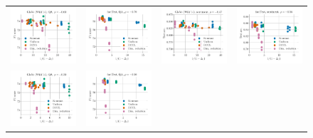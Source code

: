 \begin{figure}
\begin{tabular}{@{\hskip -0.0in}c@{\hskip -0.0in}c@{\hskip -0.0in}c@{\hskip -0.0in}c@{\hskip -0.0in}}
		\includegraphics[width=.245\linewidth]{figures/glove400k_qa_best-f1_vs_gram-large-dim-delta1-3-trans_linx_stoc.pdf} &
		\includegraphics[width=.245\linewidth]{figures/fasttext1m_qa_best-f1_vs_gram-large-dim-delta1-3-trans_linx_stoc.pdf} &
		\includegraphics[width=.245\linewidth]{figures/glove400k_sentiment_sst_test-acc_vs_gram-large-dim-delta1-3-trans_linx_stoc.pdf} &
		\includegraphics[width=.245\linewidth]{figures/fasttext1m_sentiment_sst_test-acc_vs_gram-large-dim-delta1-3-trans_linx_stoc.pdf} \\[-1em]
		\includegraphics[width=.245\linewidth]{figures/glove400k_qa_best-f1_vs_gram-large-dim-delta1-4-trans_linx_stoc.pdf} &
		\includegraphics[width=.245\linewidth]{figures/fasttext1m_qa_best-f1_vs_gram-large-dim-delta1-4-trans_linx_stoc.pdf} &

\end{tabular}
\end{figure}
